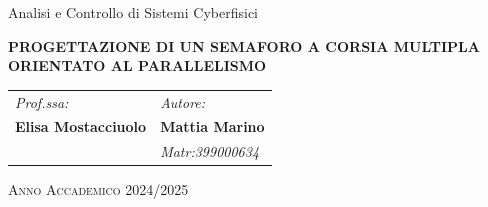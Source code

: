 \vspace{0.25cm}

\begin{center}
    Analisi e Controllo di Sistemi Cyberfisici
    
	{\LARGE \textbf{PROGETTAZIONE DI UN SEMAFORO A CORSIA MULTIPLA ORIENTATO AL PARALLELISMO} \smallskip\\}                                               
\end{center}

\vspace{2cm}
\begin{tabular}{ll}
	\textit{Prof.ssa:}        \hspace{3cm}   	& \textit{Autore:}\\
	\textbf{Elisa Mostacciuolo}      \hspace{5cm}     & \textbf{Mattia Marino}\\   
	\hspace{3cm}      & \textit{Matr:399000634}                                       					   
\end{tabular}

\vspace{2.5cm}
\begin{center}
	\textsc{Anno Accademico 2024/2025}
\end{center}

\newpage

